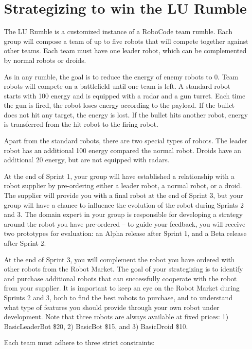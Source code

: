 \documentclass{scrreprt}
\begin{document}
\section{Strategizing to win the LU Rumble}
The LU Rumble is a customized instance of a RoboCode team rumble. Each group will compose a team of up to five robots that will compete together against other teams. Each team must have one leader robot, which can be complemented by normal robots or droids.

As in any rumble, the goal is to reduce the energy of enemy robots to 0. Team robots will compete on a battlefield until one team is left. A standard robot starts with 100 energy and is equipped with a radar and a gun turret. Each time the gun is fired, the robot loses energy according to the payload. If the bullet does not hit any target, the energy is lost. If the bullet hits another robot, energy is transferred from the hit robot to the firing robot.

Apart from the standard robots, there are two special types of robots. The leader robot has an additional 100 energy compared the normal robot. Droids have an additional 20 energy, but are not equipped with radars.

At the end of Sprint 1, your group will have established a relationship with a robot supplier by pre-ordering either a leader robot, a normal robot, or a droid. The supplier will provide you with a final robot at the end of Sprint 3, but your group will have a chance to influence the evolution of the robot during Sprints 2 and 3. The domain expert in your group is responsible for developing a strategy around the robot you have pre-ordered -- to guide your feedback, you will receive two prototypes for evaluation: an Alpha release after Sprint 1, and a Beta release after Sprint 2.

At the end of Sprint 3, you will complement the robot you have ordered with other robots from the Robot Market. The goal of your strategizing is to identify and purchase additional robots that can successfully cooperate with the robot from your supplier. It is important to keep an eye on the Robot Market during Sprints 2 and 3, both to find the best robots to purchase, and to understand what type of features you should provide through your own robot under development. Note that three robots are always available at fixed prices: 1) BasicLeaderBot \$20, 2) BasicBot \$15, and 3) BasicDroid \$10.

Each team must adhere to three strict constraints: 
\end{document}
